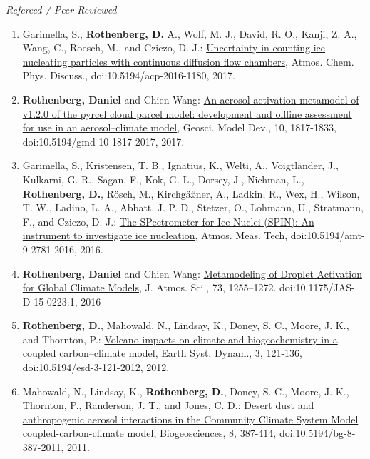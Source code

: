 \documentclass[11pt,letterpaper]{article}
\begin{document}
 \bigskip
 \emph{Refereed / Peer-Reviewed}
 \medskip
 \begin{enumerate}[itemindent=-10pt]

 \item Garimella, S., \textbf{Rothenberg, D.} A., Wolf, M. J., David, R. O., Kanji, Z. A., Wang, C., Roesch, M., and Cziczo, D. J.: \href{http://dx.doi.org/10.5194/acp-2016-1180}{Uncertainty in counting ice nucleating particles with continuous diffusion flow chambers}, Atmos. Chem. Phys. Discuss., doi:10.5194/acp-2016-1180, 2017.

 \item \textbf{Rothenberg, Daniel} and Chien Wang:  \href{http://dx.doi.org/10.5194/gmd-10-1817-2017}{An aerosol activation metamodel of v1.2.0 of the pyrcel cloud parcel model: development and offline assessment for use in an aerosol–climate model}, Geosci. Model Dev., 10, 1817-1833, doi:10.5194/gmd-10-1817-2017, 2017.

 \item Garimella, S., Kristensen, T. B., Ignatius, K., Welti, A., Voigtländer, J., Kulkarni, G. R., Sagan, F., Kok, G. L., Dorsey, J., Nichman, L., \textbf{Rothenberg, D.}, Rösch, M., Kirchgäßner, A., Ladkin, R., Wex, H., Wilson, T. W., Ladino, L. A., Abbatt, J. P. D., Stetzer, O., Lohmann, U., Stratmann, F., and Cziczo, D. J.: \href{http://www.atmos-meas-tech.net/9/2781/2016/amt-9-2781-2016.html}{The SPectrometer for Ice Nuclei (SPIN): An instrument to investigate ice nucleation}, Atmos. Meas. Tech, doi:10.5194/amt-9-2781-2016, 2016.

 \item \textbf{Rothenberg, Daniel} and Chien Wang: \href{http://dx.doi.org/10.1175/JAS-D-15-0223.1}{Metamodeling of Droplet Activation for Global Climate Models}, J. Atmos. Sci., 73, 1255–1272. doi:10.1175/JAS-D-15-0223.1, 2016

 \item \textbf{Rothenberg, D.}, Mahowald, N., Lindsay, K., Doney, S. C., Moore, J. K., and Thornton, P.: \href{http://dx.doi.org/10.5194/esd-3-121-2012}{Volcano impacts on climate and biogeochemistry in a coupled carbon–climate model}, Earth Syst. Dynam., 3, 121-136, doi:10.5194/esd-3-121-2012, 2012.

 \item Mahowald, N., Lindsay, K., \textbf{Rothenberg, D.}, Doney, S. C., Moore, J. K., Thornton, P., Randerson, J. T., and Jones, C. D.: \href{http://dx.doi.org/10.5194/bg-8-387-2011}{Desert dust and anthropogenic aerosol interactions in the Community Climate System Model coupled-carbon-climate model}, Biogeosciences, 8, 387-414, doi:10.5194/bg-8-387-2011, 2011.


\end{enumerate}
\end{document}
